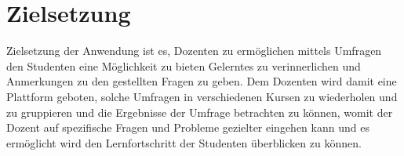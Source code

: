 \section{Zielsetzung}

Zielsetzung der Anwendung ist es, Dozenten zu ermöglichen mittels Umfragen den Studenten eine Möglichkeit zu bieten Gelerntes zu verinnerlichen und Anmerkungen zu den gestellten Fragen zu geben. Dem Dozenten wird damit eine Plattform geboten, solche Umfragen in verschiedenen Kursen zu wiederholen und zu gruppieren und die Ergebnisse der Umfrage betrachten zu können, womit der Dozent auf spezifische Fragen und Probleme gezielter eingehen kann und es ermöglicht wird den Lernfortschritt der Studenten überblicken zu können. 
